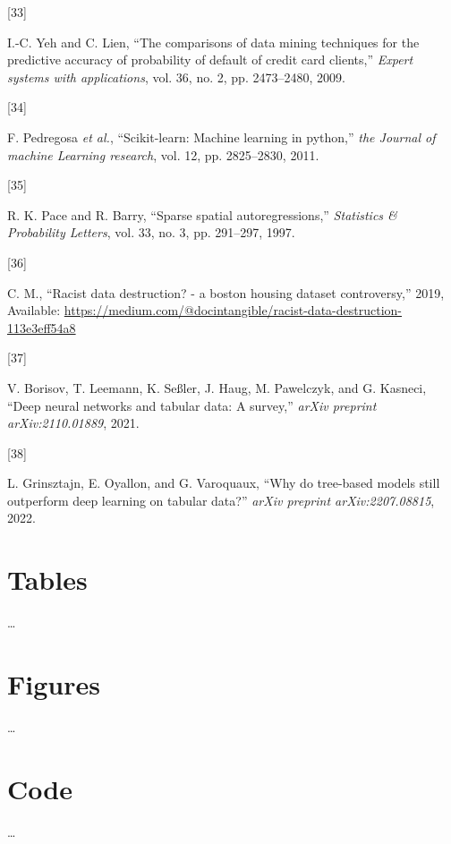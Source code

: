 \documentclass[
  conference]{IEEEtran}
\newlength{\cslhangindent}
\newlength{\csllabelwidth}
\newlength{\cslentryspacingunit} %
\newenvironment{CSLReferences}[2] %
 {%
  \setlength{\parindent}{0pt}
  \ifodd #1
  \let\oldpar\par
  \def\par{\hangindent=\cslhangindent\oldpar}
  \fi
  \setlength{\parskip}{#2\cslentryspacingunit}
 }%
 {}
\newcommand{\CSLLeftMargin}[1]{\parbox[t]{\csllabelwidth}{#1}}
\newcommand{\CSLRightInline}[1]{\parbox[t]{\linewidth - \csllabelwidth}{#1}\break}
\begin{document}
\begin{CSLReferences}{0}{0}
\leavevmode{}%
\CSLLeftMargin{{[}33{]} }%
\CSLRightInline{I.-C. Yeh and C. Lien, {``The comparisons of data mining
techniques for the predictive accuracy of probability of default of
credit card clients,''} \emph{Expert systems with applications}, vol.
36, no. 2, pp. 2473--2480, 2009.}

\leavevmode{}%
\CSLLeftMargin{{[}34{]} }%
\CSLRightInline{F. Pedregosa \emph{et al.}, {``Scikit-learn: Machine
learning in python,''} \emph{the Journal of machine Learning research},
vol. 12, pp. 2825--2830, 2011.}

\leavevmode{}%
\CSLLeftMargin{{[}35{]} }%
\CSLRightInline{R. K. Pace and R. Barry, {``Sparse spatial
autoregressions,''} \emph{Statistics \& Probability Letters}, vol. 33,
no. 3, pp. 291--297, 1997.}

\leavevmode{}%
\CSLLeftMargin{{[}36{]} }%
\CSLRightInline{C. M., {``Racist data destruction? - a boston housing
dataset controversy,''} 2019, Available:
\url{https://medium.com/@docintangible/racist-data-destruction-113e3eff54a8}}

\leavevmode{}%
\CSLLeftMargin{{[}37{]} }%
\CSLRightInline{V. Borisov, T. Leemann, K. Seßler, J. Haug, M.
Pawelczyk, and G. Kasneci, {``Deep neural networks and tabular data: A
survey,''} \emph{arXiv preprint arXiv:2110.01889}, 2021.}

\leavevmode{}%
\CSLLeftMargin{{[}38{]} }%
\CSLRightInline{L. Grinsztajn, E. Oyallon, and G. Varoquaux, {``Why do
tree-based models still outperform deep learning on tabular data?''}
\emph{arXiv preprint arXiv:2207.08815}, 2022.}

\end{CSLReferences}

\pagebreak

\hypertarget{tables}{%
\section{Tables}\label{tables}}

\ldots{}

\pagebreak

\hypertarget{figures}{%
\section{Figures}\label{figures}}

\ldots{}

\pagebreak

\hypertarget{code}{%
\section{Code}\label{code}}

\ldots{}
\end{document}
